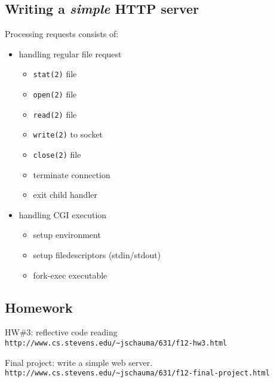 \documentclass[xga]{xdvislides}
\begin{document}
\subsection{Writing a {\em simple} HTTP server}
Processing requests consists of:
\begin{itemize}
	\item handling regular file request
		\begin{itemize}
			\item {\tt stat(2)} file
			\item {\tt open(2)} file
			\item {\tt read(2)} file
			\item {\tt write(2)} to socket
			\item {\tt close(2)} file
			\item terminate connection
			\item exit child handler
		\end{itemize}
	\item handling CGI execution
		\begin{itemize}
			\item setup environment
			\item setup filedescriptors (stdin/stdout)
			\item fork-exec executable
		\end{itemize}
\end{itemize}

\subsection{Homework}
HW\#3: reflective code reading \\
{\tt http://www.cs.stevens.edu/\~{}jschauma/631/f12-hw3.html}

\vspace{.5in}
Final project: write a simple web server. \\
{\tt http://www.cs.stevens.edu/\~{}jschauma/631/f12-final-project.html}
\end{document}
